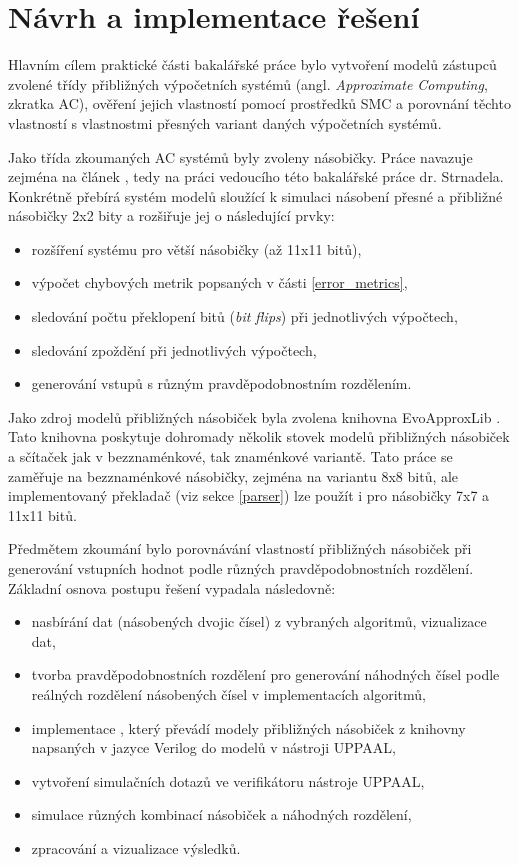 \chapter{Návrh a implementace řešení}
\label{rozbor}
Hlavním cílem praktické části bakalářské práce bylo vytvoření modelů zástupců zvolené třídy přibližných výpočetních systémů (angl. \textit{Approximate Computing}, zkratka AC), ověření jejich vlastností pomocí prostředků SMC a porovnání těchto vlastností s vlastnostmi přesných variant daných výpočetních systémů.

Jako třída zkoumaných AC systémů byly zvoleny násobičky. Práce navazuje zejména na článek \cite{smc_axc}, tedy na práci vedoucího této bakalářské práce dr. Strnadela. Konkrétně přebírá systém modelů sloužící k simulaci násobení přesné a přibližné násobičky 2x2 bity a rozšiřuje jej o následující prvky:
\begin{itemize}
    \item rozšíření systému pro větší násobičky (až 11x11 bitů),
    \item výpočet chybových metrik popsaných v části \ref{error_metrics},
    \item sledování počtu překlopení bitů (\textit{bit flips}) při jednotlivých výpočtech,
    \item sledování zpoždění při jednotlivých výpočtech,
    \item generování vstupů s různým pravděpodobnostním rozdělením.
\end{itemize}

Jako zdroj modelů přibližných násobiček byla zvolena knihovna EvoApproxLib \cite{circuit_library}. Tato knihovna poskytuje dohromady několik stovek modelů přibližných násobiček a sčítaček jak v bezznaménkové, tak znaménkové variantě. Tato práce se zaměřuje na bezznaménkové násobičky, zejména na variantu 8x8 bitů, ale implementovaný překladač (viz sekce \ref{parser}) lze použít i pro násobičky 7x7 a 11x11 bitů.

\bigskip

Předmětem zkoumání bylo porovnávání vlastností přibližných násobiček při generování vstupních hodnot podle různých pravděpodobnostních rozdělení. Základní osnova postupu řešení vypadala následovně:

\begin{itemize}
    \item nasbírání dat (násobených dvojic čísel) z vybraných algoritmů, vizualizace dat,
    \item tvorba pravděpodobnostních rozdělení pro generování náhodných čísel podle reálných rozdělení násobených čísel v implementacích algoritmů,
    \item implementace , který převádí modely přibližných násobiček z knihovny \cite{circuit_library} napsaných v jazyce Verilog do modelů v nástroji UPPAAL,
    \item vytvoření simulačních dotazů ve verifikátoru nástroje UPPAAL,
    \item simulace různých kombinací násobiček a náhodných rozdělení, 
    \item zpracování a vizualizace výsledků.
\end{itemize}

